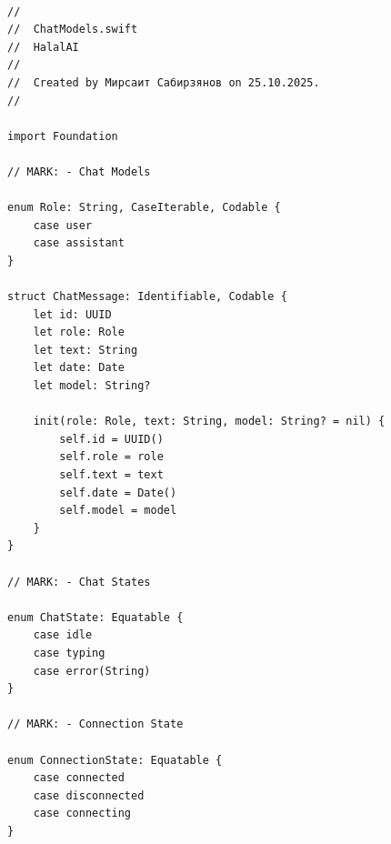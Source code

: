 \begin{lstlisting}[basicstyle=\tiny\ttfamily,breaklines=true]

//
//  ChatModels.swift
//  HalalAI
//
//  Created by Мирсаит Сабирзянов on 25.10.2025.
//

import Foundation

// MARK: - Chat Models

enum Role: String, CaseIterable, Codable {
    case user
    case assistant
}

struct ChatMessage: Identifiable, Codable {
    let id: UUID
    let role: Role
    let text: String
    let date: Date
    let model: String?
    
    init(role: Role, text: String, model: String? = nil) {
        self.id = UUID()
        self.role = role
        self.text = text
        self.date = Date()
        self.model = model
    }
}

// MARK: - Chat States

enum ChatState: Equatable {
    case idle
    case typing
    case error(String)
}

// MARK: - Connection State

enum ConnectionState: Equatable {
    case connected
    case disconnected
    case connecting
}
\end{lstlisting}

